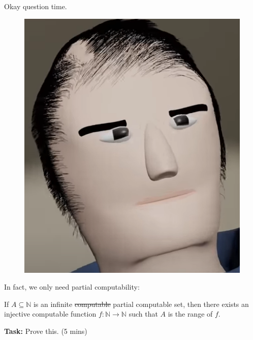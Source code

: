 \documentclass{beamer}
\begin{document}
\begin{frame}{Okay question time.}

\begin{figure}[h]
\centering
\includegraphics[scale=0.2]{img/bench_appearo.png}
\end{figure}

In fact, we only need partial computability:

\vspace{2mm}

If $A \subseteq \mathbb N$ is an infinite \sout{computable} partial computable set, then there exists an injective computable function $f: \mathbb N \to \mathbb N$ such that $A$ is the range of $f$.

\vspace{2mm}

\textbf{Task:} Prove this. (5 mins)
\end{frame}
\end{document}
